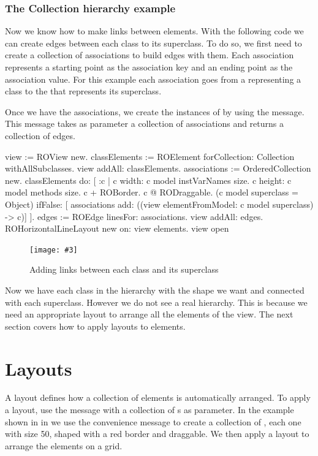 \documentclass[a4paper,10pt,twoside]{book}
\newcommand{\fig}[4]{
		\begin{figure}[#1]
			\centering
			\texttt{[image: \#3]}
			\caption{\label{fig:#3}#4}
		\end{figure}}
\begin{document}
\subsubsection{The Collection hierarchy example}
Now we know how to make links between elements. With the following code we can create edges between each class to its superclass. 
To do so, we first need to create a collection of associations to build edges with them. Each association represents a starting point as the association key and an ending point as the association value. For this example each association goes from a  representing a class to the  that represents its superclass. 

Once we have the associations, we create the instances of  by using the  message. This message takes as parameter a collection of associations and returns a collection of edges.


\begin{code}{}
view := ROView new.
classElements := ROElement forCollection: Collection withAllSubclasses.
view addAll: classElements.
associations := OrderedCollection new.
classElements do: [ :c | 
	c width: c model instVarNames size.
	c height: c model methods size.
	c + ROBorder. 
	c @ RODraggable.	
	(c model superclass = Object)
		ifFalse: [ associations add: ((view elementFromModel: c model superclass) -> c)]	
	 ].
edges := ROEdge linesFor: associations.
view addAll: edges.
ROHorizontalLineLayout new on: view elements.
view open
\end{code}

\fig{H}{0.5}{hier3}{Adding links between each class and its superclass}

Now we have each class in the  hierarchy with the shape we want and connected with each superclass. However we do not see a real hierarchy. This is because we need an appropriate layout to arrange all the elements of the view. The next section covers how to apply layouts to elements.


\section{Layouts} 
A layout defines how a collection of elements is automatically arranged. To apply a layout, use the  message with a collection of s as parameter. In the example shown in in  we use the  convenience message to create a collection of , each one with size 50, shaped with a red border and draggable. We then apply a layout to arrange the elements on a grid.
\end{document}
